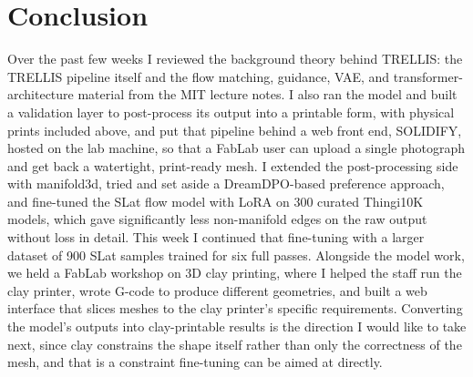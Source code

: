 \documentclass[11pt,a4paper]{article}
\begin{document}
\section{Conclusion}
Over the past few weeks I reviewed the background theory behind TRELLIS: the TRELLIS pipeline itself and the flow matching, guidance, VAE, and transformer-architecture material from the MIT lecture notes. I also ran the model and built a validation layer to post-process its output into a printable form, with physical prints included above, and put that pipeline behind a web front end, SOLIDIFY, hosted on the lab machine, so that a FabLab user can upload a single photograph and get back a watertight, print-ready mesh. I extended the post-processing side with manifold3d, tried and set aside a DreamDPO-based preference approach, and fine-tuned the SLat flow model with LoRA on 300 curated Thingi10K models, which gave significantly less non-manifold edges on the raw output without loss in detail. This week I continued that fine-tuning with a larger dataset of 900 SLat samples trained for six full passes. Alongside the model work, we held a FabLab workshop on 3D clay printing, where I helped the staff run the clay printer, wrote G-code to produce different geometries, and built a web interface that slices meshes to the clay printer's specific requirements. Converting the model's outputs into clay-printable results is the direction I would like to take next, since clay constrains the shape itself rather than only the correctness of the mesh, and that is a constraint fine-tuning can be aimed at directly.
\end{document}
